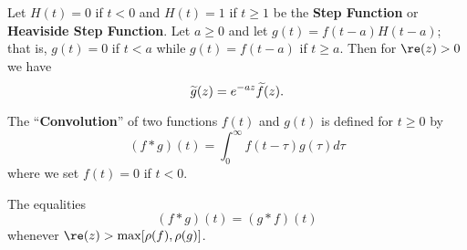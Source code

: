 \begin{thm}%
Let $H(t)=0$ if $t<0$ and $H(t)=1$ if $t\geq1$ be the
\textbf{Step Function} or \textbf{Heaviside Step Function}. Let
$a\geq0$ and let $g(t)=f(t-a)H(t-a)$; that is, $g(t)=0$ if $t<a$
while $g(t)=f(t-a)$ if $t\geq a$. Then for $\re(z)>0$ we have
\begin{equation}%
\wt{g}(z)=e^{-az}\wt{f}(z).
\end{equation}
\end{thm}
\begin{defn}[Convolution]%
The ``\textbf{Convolution}'' of two functions $f(t)$ and $g(t)$
is defined for $t\geq0$ by
\begin{equation}%
(f*g)(t)=\int^{\infty}_{0}f(t-\tau)g(\tau)d\tau
\end{equation}
where we set $f(t)=0$ if $t<0$.
\end{defn}
\begin{thm}%
The equalities
\begin{equation}%
(f*g)(t) = (g*f)(t)
\end{equation}
whenever $\re(z)>\max[\rho(f),\rho(g)]$.
\end{thm}




